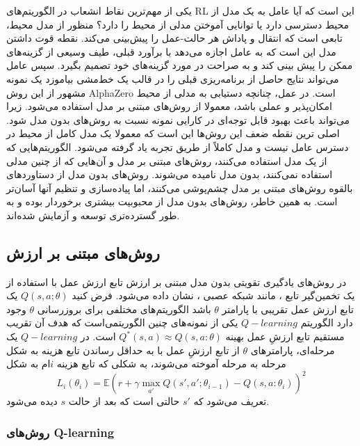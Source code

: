 
یکی از مهم‌ترین نقاط انشعاب در الگوریتم‌‌های RL این است که آیا عامل به یک مدل از محیط دسترسی دارد یا  توانایی آموختن مدلی از محیط را دارد؟ منظور از مدل محیط، تابعی است که انتقال و پاداش هر حالت-عمل را پیش‌بینی می‌کند.
نقطه قوت داشتن مدل این است که به عامل اجازه می‌دهد با برآورد قبلی، طیف وسیعی از گزینه‌های ممکن را پیش بینی کند و به صراحت در مورد گزینه‌های خود تصمیم بگیرد. سپس عامل می‌تواند نتایج حاصل از برنامه‌ریزی قبلی را در قالب یک خط‌مشی بیاموزد یک نمونه مشهور از این روش 
AlphaZero است. در عمل، چنانچه دستیابی به مدلی از محیط امکان‌پذیر و عملی باشد، معمولا از روش‌های مبتنی بر مدل استفاده می‌شود. زیرا می‌تواند باعث بهبود قابل توجه‌ای در کارایی نمونه نسبت به روش‌های بدون مدل شود. اصلی ترین نقطه ضعف این روش‌ها این است که معمولا یک مدل کامل از محیط  در دسترس عامل نیست و مدل کاملاً از طریق تجربه یاد گرفته می‌شود. الگوریتم‌هایی که از یک مدل استفاده می‌کنند، روش‌های مبتنی بر مدل و آن‌هایی که از چنین مدلی استفاده نمی‌کنند، بدون مدل نامیده می‌شوند. روش‌های بدون مدل از دستاوردهای بالقوه روش‌های مبتنی بر مدل چشم‌پوشی می‌کنند‌، اما پیاده‌سازی و تنظیم آنها آسان‌تر است. به همین خاطر، روش‌های بدون مدل از محبوبیت بیشتری برخوردار بوده و به طور گسترده‌تری توسعه و آزمایش شده‌اند.

\subsection{روش‌های مبتنی بر ارزش}


در روش‌های یادگیری تقویتی بدون مدل مبتنی بر ارزش
تابع ارزش عمل با استفاده از  یک تخمین‌گیر تابع
 ، مانند شبکه عصبی ، نشان داده می‌شود. فرض کنید
$Q(s,a;\theta)$
یک تابع ارزش عمل تقریبی با پارامتر 
$\theta$
باشد
الگوریتم‌های مختلفی برای بروزرسانی $\theta$ وجود دارد
الگوریتم $ Q-learning$ یکی از نمونه‌های چنین الگوریتمی‌است
که هدف آن تقریب مستقیم تابع ارزشِ عمل بهینه 
$Q^*(s,a) \approx Q(s,a: \theta)$
 است. در $ Q-learning$ یک مرحله‌ای، پارامترهای $\theta$ از تابع ارزشِ عمل با به حداقل رساندن تابع هزینه به شکل مرحله به مرحله آموخته می‌شوند، به شکلی که تابع هزینه $i$ام به شکل 
$$L_i(\theta_i) = \mathbb{E} {\left( r+\gamma \max_{a'} Q(s',a'; \theta_{i-1})- Q(s,a:\theta_i) \right)}^2$$
 تعریف می‌شود که 
 $s'$
 حالتی است که بعد از حالت $s$ دیده می‌شود.
 \subsubsection{روش‌های Q-learning}


